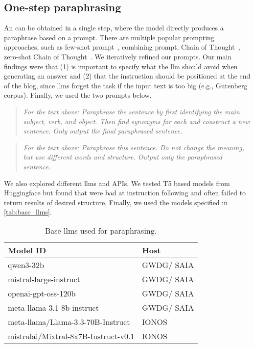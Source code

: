 \subsection{One-step paraphrasing}
An \imp{} can be obtained in a single step, where the model directly produces a paraphrase based on a prompt.
There are multiple popular prompting approaches, such as few-shot prompt~\citep{brown_few_shot_prompting_2020}, combining prompt, Chain of Thought~\citep{Wei_CoT_2022}, zero-shot Chain of Thought~\citep{kojima_zeroshot_2022}.
We iteratively refined our prompts. 
Our main findings were that (1) is important to specify what the \ac{llm} should avoid when generating an answer and (2) that the instruction should be positioned at the end of the blog, since \acp{llm} forget the task if the input text is too big (e.g., Gutenberg corpus).
Finally, we used the two prompts below.
\begin{quote}
    \textit{For the text above: Paraphrase the sentence by first identifying the main subject, verb, and object. Then find synonyms for each and construct a new sentence. Only output the final paraphrased sentence.}
\end{quote}
\begin{quote}
    \textit{For the text above: Paraphrase this sentence. Do not change the meaning, but use different words and structure. Output only the paraphrased sentence.}
\end{quote}

We also explored different \acp{llm} and APIs.
We tested T5 based models from Huggingface but found that were bad at instruction following and often failed to return results of desired structure.
Finally, we used the models specified in \autoref{tab:base_llms}.
\begin{table}[]
\centering
\caption{Base \acp{llm} used for paraphrasing.}
\label{tab:base_llms}
\begin{tabular}{ll}
\toprule
\textbf{Model ID}                    & \textbf{Host} \\
\midrule
qwen3-32b                            & GWDG/ SAIA    \\
mistral-large-instruct               & GWDG/ SAIA    \\
openai-gpt-oss-120b                  & GWDG/ SAIA    \\
meta-llama-3.1-8b-instruct           & GWDG/ SAIA    \\
meta-llama/Llama-3.3-70B-Instruct    & IONOS         \\
mistralai/Mixtral-8x7B-Instruct-v0.1 & IONOS     \\
\bottomrule   
\end{tabular}%
\end{table}


